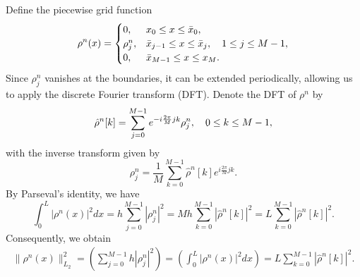 \documentclass[10pt, reqno]{amsart}
\theoremstyle{remark}
\theoremstyle{definition}
\numberwithin{table}{section}
\begin{document}
Define the piecewise grid function 
\begin{align}
\rho^n(x)= \begin{cases}0,  & x_0 \leq x \leq \bar{x}_{0},  \\ \rho_j^n,  & \bar{x}_{j-1} \leq x \leq \bar{x}_{j},  \quad 1 \leq j \leq M-1,  \\ 0,  & \bar{x}_{M-1} \leq x \leq x_M . \end{cases}\notag
\end{align}
Since $\rho_j^n$ vanishes at the boundaries, it can be extended periodically, allowing us to apply the discrete Fourier transform (DFT). Denote the DFT of $\rho^n$ by
\begin{equation}
\hat{\rho}^n[k]=\sum_{j=0}^{M-1} e^{-i \frac{2 \pi}{M} j k} \rho^n_j, \quad 0\le k\le M-1, \notag
\end{equation}
with the inverse transform given by
\[
\rho^n_j = \frac{1}{M} \sum_{k=0}^{M-1} \hat{\rho}^n[k] e^{i \frac{2\pi}{M} jk}.
\]
By Parseval’s identity, we have
$$
\int_0^L|\rho^n(x)|^2 d x=h\sum_{j=0}^{M-1}|\rho^n_j|^2=Mh\sum_{k=0}^{M-1}|\hat{\rho}^n[k]|^2 =L\sum_{k=0}^{M-1}|\hat{\rho}^n[k]|^2. 
$$
Consequently, we obtain
\begin{align}
    \|\rho^n(x)\|_{L_2}^2=(\sum_{j=0}^{M-1} h|\rho_j^n|^2)=(\int_0^L|\rho^n(x)|^2 d x)=L\sum_{k=0}^{M-1}|\hat{\rho}^n[k]|^2.\label{rhoequal}
\end{align}
\end{document}
